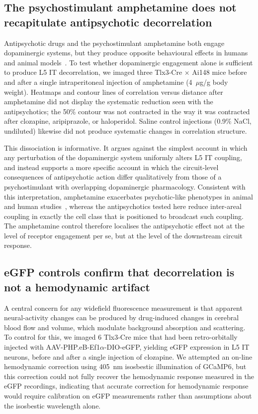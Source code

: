 \documentclass[11pt]{article}
\begin{document}
\subsection{The psychostimulant amphetamine does not recapitulate antipsychotic decorrelation}

Antipsychotic drugs and the psychostimulant amphetamine both engage dopaminergic systems, but they produce opposite behavioural effects in humans and animal models~\citep{howes2009dopamine}. To test whether dopaminergic engagement alone is sufficient to produce L5 IT decorrelation, we imaged three Tlx3-Cre $\times$ Ai148 mice before and after a single intraperitoneal injection of amphetamine (4~$\mu$g/g body weight). Heatmaps and contour lines of correlation versus distance after amphetamine did not display the systematic reduction seen with the antipsychotics; the 50\% contour was not contracted in the way it was contracted after clozapine, aripiprazole, or haloperidol. Saline control injections (0.9\% NaCl, undiluted) likewise did not produce systematic changes in correlation structure.

This dissociation is informative. It argues against the simplest account in which any perturbation of the dopaminergic system uniformly alters L5 IT coupling, and instead supports a more specific account in which the circuit-level consequences of antipsychotic action differ qualitatively from those of a psychostimulant with overlapping dopaminergic pharmacology. Consistent with this interpretation, amphetamine exacerbates psychotic-like phenotypes in animal and human studies~\citep{howes2009dopamine, kambeitz2014alterations}, whereas the antipsychotics tested here reduce inter-areal coupling in exactly the cell class that is positioned to broadcast such coupling. The amphetamine control therefore localises the antipsychotic effect not at the level of receptor engagement per se, but at the level of the downstream circuit response.

\subsection{eGFP controls confirm that decorrelation is not a hemodynamic artifact}

A central concern for any widefield fluorescence measurement is that apparent neural-activity changes can be produced by drug-induced changes in cerebral blood flow and volume, which modulate background absorption and scattering. To control for this, we imaged 6 Tlx3-Cre mice that had been retro-orbitally injected with AAV-PHP.eB-Ef1$\alpha$-DIO-eGFP, yielding eGFP expression in L5 IT neurons, before and after a single injection of clozapine. We attempted an on-line hemodynamic correction using 405~nm isosbestic illumination of GCaMP6, but this correction could not fully recover the hemodynamic response measured in the eGFP recordings, indicating that accurate correction for hemodynamic response would require calibration on eGFP measurements rather than assumptions about the isosbestic wavelength alone.
\end{document}
